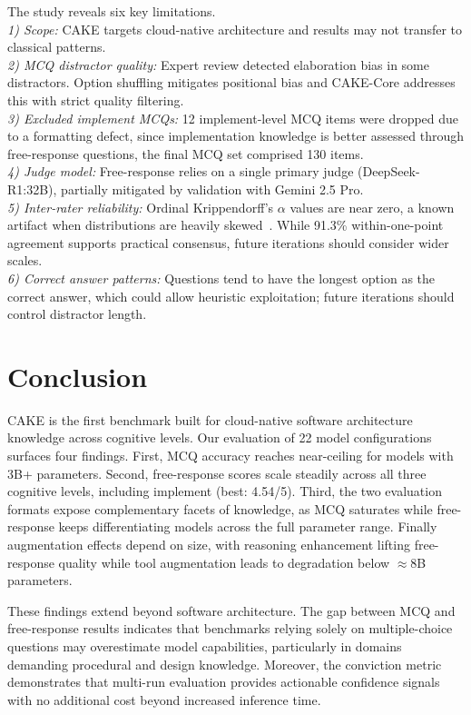 \documentclass[conference]{IEEEtran}
\begin{document}
The study reveals six key limitations.
\\\textit{1) Scope:} CAKE targets cloud-native architecture and results may not transfer to classical patterns.
\\\textit{2) MCQ distractor quality:} Expert review detected elaboration bias in some distractors. Option shuffling mitigates positional bias and CAKE-Core addresses this with strict quality filtering.
\\\textit{3) Excluded implement MCQs:} 12 implement-level MCQ items were dropped due to a formatting defect, since implementation knowledge is better assessed through free-response questions, the final MCQ set comprised 130 items.
\\\textit{4) Judge model:} Free-response relies on a single primary judge (DeepSeek-R1:32B), partially mitigated by validation with Gemini 2.5 Pro.
\\\textit{5) Inter-rater reliability:} Ordinal Krippendorff's $\alpha$ values are near zero, a known artifact when distributions are heavily skewed~\cite{b16}. While 91.3\% within-one-point agreement supports practical consensus, future iterations should consider wider scales.
\\\textit{6) Correct answer patterns:} Questions tend to have the longest option as the correct answer, which could allow heuristic exploitation; future iterations should control distractor length.

\section{Conclusion}
\label{sec:conclusion}
CAKE is the first benchmark built for cloud-native software architecture knowledge across cognitive levels. Our evaluation of 22 model configurations surfaces four findings. First, MCQ accuracy reaches near-ceiling for models with 3B+ parameters. Second, free-response scores scale steadily across all three cognitive levels, including implement (best: 4.54/5). Third, the two evaluation formats expose complementary facets of knowledge, as MCQ saturates while free-response keeps differentiating models across the full parameter range. Finally augmentation effects depend on size, with reasoning enhancement lifting free-response quality while tool augmentation leads to degradation below $\approx$8B parameters.

These findings extend beyond software architecture. The gap between MCQ and free-response results indicates that benchmarks relying solely on multiple-choice questions may overestimate model capabilities, particularly in domains demanding procedural and design knowledge. Moreover, the conviction metric demonstrates that multi-run evaluation provides actionable confidence signals with no additional cost beyond increased inference time.
\end{document}
